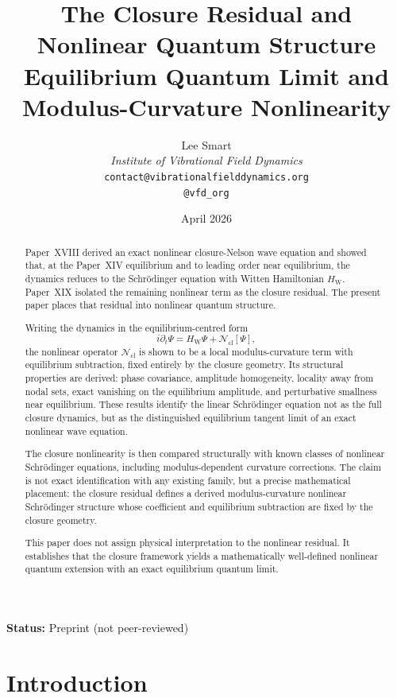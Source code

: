 \documentclass[12pt]{article}
\title{The Closure Residual and Nonlinear Quantum Structure\\[6pt]
\large Equilibrium Quantum Limit and Modulus-Curvature Nonlinearity}
\author{%
  Lee Smart\\[4pt]
  \textit{Institute of Vibrational Field Dynamics}\\[2pt]
  \texttt{contact@vibrationalfielddynamics.org}\\[2pt]
  \texttt{@vfd\_org}%
}
\date{April 2026}
\newcommand{\Ncl}{\mathcal{N}_{\mathrm{cl}}}
\newcommand{\HW}{H_{\mathrm{W}}}
\begin{document}
\maketitle

\noindent\textbf{Status:} Preprint (not peer-reviewed)

\begin{abstract}
Paper~XVIII derived an exact nonlinear closure-Nelson wave equation and showed that, at the Paper~XIV equilibrium and to leading order near equilibrium, the dynamics reduces to the Schr\"odinger equation with Witten Hamiltonian $\HW$. Paper~XIX isolated the remaining nonlinear term as the closure residual. The present paper places that residual into nonlinear quantum structure.

Writing the dynamics in the equilibrium-centred form
\[
i\partial_t\Psi = \HW\Psi + \Ncl[\Psi],
\]
the nonlinear operator $\Ncl$ is shown to be a local modulus-curvature term with equilibrium subtraction, fixed entirely by the closure geometry. Its structural properties are derived: phase covariance, amplitude homogeneity, locality away from nodal sets, exact vanishing on the equilibrium amplitude, and perturbative smallness near equilibrium. These results identify the linear Schr\"odinger equation not as the full closure dynamics, but as the distinguished equilibrium tangent limit of an exact nonlinear wave equation.

The closure nonlinearity is then compared structurally with known classes of nonlinear Schr\"odinger equations, including modulus-dependent curvature corrections. The claim is not exact identification with any existing family, but a precise mathematical placement: the closure residual defines a derived modulus-curvature nonlinear Schr\"odinger structure whose coefficient and equilibrium subtraction are fixed by the closure geometry.

This paper does not assign physical interpretation to the nonlinear residual. It establishes that the closure framework yields a mathematically well-defined nonlinear quantum extension with an exact equilibrium quantum limit.
\end{abstract}

\section{Introduction}\label{sec:intro}
\end{document}
